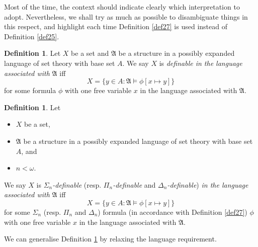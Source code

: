 \documentclass[12pt, twoside]{memoir}
\numberwithin{equation}{section}
\theoremstyle{definition}
\newtheorem{defi}[thm]{Definition}
\theoremstyle{remark}
\theoremstyle{definition}
\theoremstyle{definition}
\theoremstyle{definition}
\theoremstyle{remark}
\begin{document}
Most of the time, the context should indicate clearly which interpretation to adopt. Nevertheless, we shall try as much as possible to disambiguate things in this respect, and highlight each time Definition \ref{def27} is used instead of Definition \ref{def25}.

\begin{defi}
Let $X$ be a set and $\mathfrak{A}$ be a structure in a possibly expanded language of set theory with base set $A$. We say $X$ is \emph{definable in the language associated with} $\mathfrak{A}$ iff $$X = \{y \in A : \mathfrak{A} \models \phi[x \mapsto y]\}$$ for some formula $\phi$ with one free variable $x$ in the language associated with $\mathfrak{A}$.
\end{defi}

\begin{defi}\label{def29}
Let 
\begin{itemize}
    \item $X$ be a set,
    \item $\mathfrak{A}$ be a structure in a possibly expanded language of set theory with base set $A$, and
    \item $n < \omega$. 
\end{itemize} 
We say $X$ is $\Sigma_n$\emph{-definable} (resp. $\Pi_n$\emph{-definable} and $\Delta_n$\emph{-definable}) \emph{in the language associated with} $\mathfrak{A}$ iff $$X = \{y \in A : \mathfrak{A} \models \phi[x \mapsto y]\}$$ for some $\Sigma_n$ (resp. $\Pi_n$ and $\Delta_n$) formula (in accordance with Definition \ref{def27}) $\phi$ with one free variable $x$ in the language associated with $\mathfrak{A}$.
\end{defi}

We can generalise Definition \ref{def29} by relaxing the language requirement.
\end{document}
